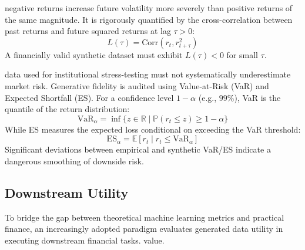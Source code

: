 negative returns increase future volatility more severely than positive returns of the same magnitude. It is rigorously quantified by the cross-correlation between past returns and future squared returns at lag $\tau > 0$:
    \begin{equation}
        L(\tau) = \text{Corr}(r_t, r_{t+\tau}^2)
    \end{equation}
A financially valid synthetic dataset must exhibit $L(\tau) < 0$ for small $\tau$.

data used for institutional stress-testing must not systematically underestimate market risk. Generative fidelity is audited using Value-at-Risk (VaR) and Expected Shortfall (ES). For a confidence level $1 - \alpha$ (e.g., $99\%$), VaR is the quantile of the return distribution:
    \begin{equation}
        \text{VaR}_\alpha = \inf \{ z \in \mathbb{R} \mid \mathbb{P}(r_t \le z) \ge 1 - \alpha \}
    \end{equation}
While ES measures the expected loss conditional on exceeding the VaR threshold:
    \begin{equation}
        \text{ES}_\alpha = \mathbb{E}[r_t \mid r_t \le \text{VaR}_\alpha]
    \end{equation}
Significant deviations between empirical and synthetic VaR/ES indicate a dangerous smoothing of downside risk.

\subsection{Downstream Utility }
To bridge the gap between theoretical machine learning metrics and practical finance, an increasingly adopted paradigm evaluates generated data utility in executing downstream financial tasks. value.

